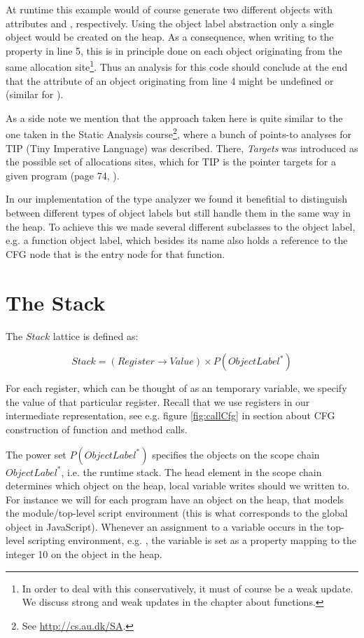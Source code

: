 At runtime this example would of course generate two different  objects with attributes  and , respectively. Using the object label abstraction only a single  object would be created on the heap. As a consequence, when writing to the property  in line 5, this is in principle done on each object originating from the same allocation site\footnote{In order to deal with this conservatively, it must of course be a weak update. We discuss strong and weak updates in the chapter about functions.}. Thus an analysis for this code should conclude at the end that the attribute  of an object originating from line 4 might be undefined or  (similar for ).

As a side note we mention that the approach taken here is quite similar to the one taken in the Static Analysis course\footnote{See \url{http://cs.au.dk/SA}.}, where a bunch of points-to analyses for TIP (Tiny Imperative Language) was described. There, \textit{Targets} was introduced as the possible set of allocations sites, which for TIP is the pointer targets  for a given program (page 74, \cite{sa}).

In our implementation of the type analyzer we found it benefitial to distinguish between different types of object labels but still handle them in the same way in the heap. To achieve this we made several different subclasses to the object label, e.g. a function object label, which besides its name also holds a reference to the CFG node that is the entry node for that function.

\section{The Stack}
The $Stack$ lattice is defined as:

\begin{equation*}
Stack = (Register \rightarrow Value) \times P(ObjectLabel^{*})
\end{equation*}

For each register, which can be thought of as an temporary variable, we specify the value of that particular register. Recall that we use registers in our intermediate representation, see e.g. figure \ref{fig:callCfg} in section \label{CFG calls} about CFG construction of function and method calls.

The power set $P(ObjectLabel^{*})$ specifies the objects on the scope chain $ObjectLabel^{*}$, i.e. the runtime stack. The head element in the scope chain determines which object on the heap, local variable writes should we written to. For instance we will for each program have an object on the heap, that models the module/top-level script environment \cite{pyref.main} (this is what corresponds to the global object in JavaScript). Whenever an assignment to a variable occurs in the top-level scripting environment, e.g. , the variable  is set as a property mapping to the integer 10 on the  object in the heap.

